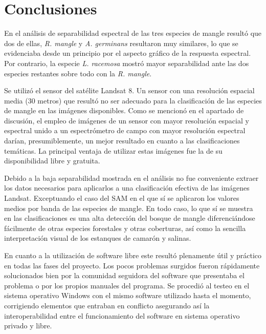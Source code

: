 


\chapter{Conclusiones}

En el análisis de separabilidad espectral de las tres especies de mangle resultó que dos de ellas, \textit{R. mangle} y \textit{A. germinans} resultaron muy similares, lo que se evidenciaba desde un principio por el aspecto gráfico de la respuesta espectral. Por contrario, la especie \textit{L. racemosa} mostró mayor separabilidad ante las dos especies restantes sobre todo con la \textit{R. mangle}.

Se utilizó el sensor del satélite Landsat 8. Un sensor con una resolución espacial media (30 metros) que resultó no ser adecuado para la clasificación de las especies de mangle en las imágenes disponibles. Como se mencionó en el apartado de discusión, el empleo de imágenes de un sensor con mayor resolución espacial y espectral unido a un espectrómetro de campo con mayor resolución espectral darían, presumiblemente, un mejor resultado en cuanto a las clasificaciones temáticas. La principal ventaja de utilizar estas imágenes fue la de su disponibilidad libre y gratuita.

Debido a la baja separabilidad mostrada en el análisis no fue conveniente extraer los datos necesarios para aplicarlos a una clasificación efectiva de las imágenes Landsat. Exceptuando el caso del \ac{SAM} en el que sí se aplicaron los valores medios por banda de las especies de mangle. En todo caso, lo que sí se muestra en las clasificaciones es una alta detección del bosque de mangle diferenciándose fácilmente de otras especies forestales y otras coberturas, así como la sencilla interpretación visual de los estanques de camarón y salinas.

En cuanto a la utilización de software libre este resultó plenamente útil y práctico en todas las fases del proyecto. Los pocos problemas surgidos fueron rápidamente solucionados bien por la comunidad seguidora del software que presentaba el problema o por los propios manuales del programa. Se procedió al testeo en el sistema operativo Windows con el mismo software utilizado hasta el momento, corrigiendo elementos que entraban en conflicto asegurando así la interoperabilidad entre el funcionamiento del software en sistema operativo privado y libre.